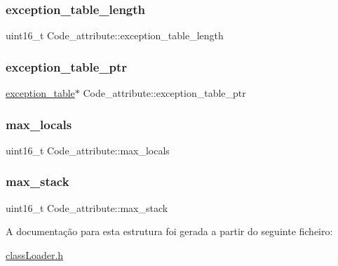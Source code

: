 \subsubsection{\texorpdfstring{exception\+\_\+table\+\_\+length}{exception\_table\_length}}
{\footnotesize\ttfamily uint16\+\_\+t Code\+\_\+attribute\+::exception\+\_\+table\+\_\+length}

\hypertarget{struct_code__attribute_af5c8031eb2ccf44c7684e4cb02169f14}{}\label{struct_code__attribute_af5c8031eb2ccf44c7684e4cb02169f14} 
\subsubsection{\texorpdfstring{exception\+\_\+table\+\_\+ptr}{exception\_table\_ptr}}
{\footnotesize\ttfamily \hyperlink{structexception__table}{exception\+\_\+table}$\ast$ Code\+\_\+attribute\+::exception\+\_\+table\+\_\+ptr}

\hypertarget{struct_code__attribute_a0a71ae93e4baacd4ef38848fec7a60d7}{}\label{struct_code__attribute_a0a71ae93e4baacd4ef38848fec7a60d7} 
\subsubsection{\texorpdfstring{max\+\_\+locals}{max\_locals}}
{\footnotesize\ttfamily uint16\+\_\+t Code\+\_\+attribute\+::max\+\_\+locals}

\hypertarget{struct_code__attribute_a48a438e661b3dd97b10a3dd59936da99}{}\label{struct_code__attribute_a48a438e661b3dd97b10a3dd59936da99} 
\subsubsection{\texorpdfstring{max\+\_\+stack}{max\_stack}}
{\footnotesize\ttfamily uint16\+\_\+t Code\+\_\+attribute\+::max\+\_\+stack}



A documentação para esta estrutura foi gerada a partir do seguinte ficheiro\+:\begin{DoxyCompactItemize}
\item 
\hyperlink{class_loader_8h}{class\+Loader.\+h}\end{DoxyCompactItemize}
